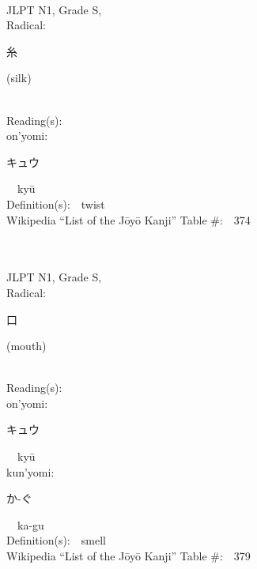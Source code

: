 \begin{multicols}{2}
{\fontsize{34pt}{40pt}  }\ \ \\
{JLPT N1, Grade S, \\Radical:\ \ {\begin{CJK}{UTF8}{min} 糸 \end{CJK}} (silk) } \\
Reading(s):\ \ \\
{\hspace*{1em}}on'yomi:\ \ \\
{\hspace*{2em}}{\begin{CJK}{UTF8}{min} キュウ \end{CJK}}\ \ ky\=u\ \ \\
Definition(s):\ \ twist \\
Wikipedia ``List of the J\=oy\=o Kanji'' Table \#:\ \ 374 \\
\ \ \\
{\fontsize{34pt}{40pt}  }\ \ \\
{JLPT N1, Grade S, \\Radical:\ \ {\begin{CJK}{UTF8}{min} 口 \end{CJK}} (mouth) } \\
Reading(s):\ \ \\
{\hspace*{1em}}on'yomi:\ \ \\
{\hspace*{2em}}{\begin{CJK}{UTF8}{min} キュウ \end{CJK}}\ \ ky\=u\ \ \\
{\hspace*{1em}}kun'yomi:\ \ \\
{\hspace*{2em}}{\begin{CJK}{UTF8}{min} か-ぐ \end{CJK}}\ \ ka-gu\ \ \\
Definition(s):\ \ smell \\
Wikipedia ``List of the J\=oy\=o Kanji'' Table \#:\ \ 379 \\
\ \ \\
{\fontsize{34pt}{40pt}  }\ \ \\

\end{multicols}
